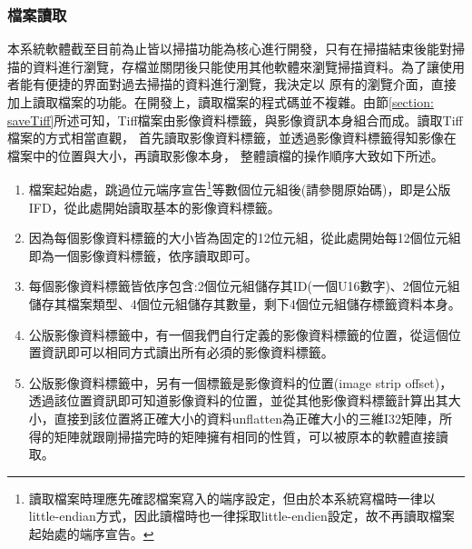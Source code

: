 \documentclass[12pt]{article}
\begin{document}
\subsubsection{檔案讀取}
本系統軟體截至目前為止皆以掃描功能為核心進行開發，只有在掃描結束後能對掃描的資料進行瀏覽，存檔並關閉後只能使用其他軟體來瀏覽掃描資料。為了讓使用者能有便捷的界面對過去掃描的資料進行瀏覽，我決定以
原有的瀏覽介面，直接加上讀取檔案的功能。在開發上，讀取檔案的程式碼並不複雜。由節\ref{section: saveTiff}所述可知，Tiff檔案由影像資料標籤，與影像資訊本身組合而成。讀取Tiff檔案的方式相當直觀，
首先讀取影像資料標籤，並透過影像資料標籤得知影像在檔案中的位置與大小，再讀取影像本身，
整體讀檔的操作順序大致如下所述。
\begin{enumerate}
    \item 檔案起始處，跳過位元端序宣告\footnote{讀取檔案時理應先確認檔案寫入的端序設定，但由於本系統寫檔時一律以little-endian方式，因此讀檔時也一律採取little-endien設定，故不再讀取檔案起始處的端序宣告。}等數個位元組後(請參閱原始碼)，即是公版IFD，從此處開始讀取基本的影像資料標籤。
    \item 因為每個影像資料標籤的大小皆為固定的12位元組，從此處開始每12個位元組即為一個影像資料標籤，依序讀取即可。
    \item 每個影像資料標籤皆依序包含:2個位元組儲存其ID(一個U16數字)、2個位元組儲存其檔案類型、4個位元組儲存其數量，剩下4個位元組儲存標籤資料本身。
    \item 公版影像資料標籤中，有一個我們自行定義的影像資料標籤的位置，從這個位置資訊即可以相同方式讀出所有必須的影像資料標籤。
    \item 公版影像資料標籤中，另有一個標籤是影像資料的位置(image strip offset)，透過該位置資訊即可知道影像資料的位置，並從其他影像資料標籤計算出其大小，直接到該位置將正確大小的資料unflatten為正確大小的三維I32矩陣，所得的矩陣就跟剛掃描完時的矩陣擁有相同的性質，可以被原本的軟體直接讀取。
\end{enumerate}
\end{document}
